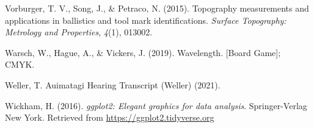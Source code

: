 \documentclass[print]{nuthesis}
\newlength{\cslhangindent}
\newenvironment{CSLReferences}[2]%
{\setlength{\parindent}{0pt}%
\everypar{\setlength{\hangindent}{\cslhangindent}}\ignorespaces}%
{\par}
\begin{document}
\begin{CSLReferences}{1}{0}
\leavevmode{}%
Vorburger, T. V., Song, J., \& Petraco, N. (2015). Topography measurements and applications in ballistics and tool mark identifications. \emph{Surface Topography: Metrology and Properties}, \emph{4}(1), 013002.

\leavevmode{}%
Warsch, W., Hague, A., \& Vickers, J. (2019). Wavelength. {[}Board Game{]}; {CMYK}.

\leavevmode{}%
Weller, T. {Auimatagi} {Hearing} {Transcript} ({Weller}) (2021).

\leavevmode{}%
Wickham, H. (2016). \emph{ggplot2: Elegant graphics for data analysis}. Springer-Verlag New York. Retrieved from \url{https://ggplot2.tidyverse.org}

\end{CSLReferences}


\backmatter

% 






\end{document}
